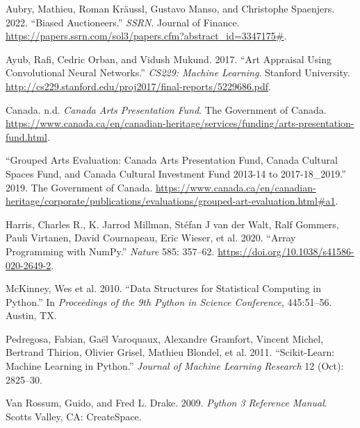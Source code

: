\documentclass[
]{article}
\newlength{\cslhangindent}
\newlength{\cslentryspacingunit} %
\newenvironment{CSLReferences}[2] %
 {%
  \setlength{\parindent}{0pt}
  \ifodd #1
  \let\oldpar\par
  \def\par{\hangindent=\cslhangindent\oldpar}
  \fi
  \setlength{\parskip}{#2\cslentryspacingunit}
 }%
 {}
\begin{document}
\hypertarget{refs}{}
\begin{CSLReferences}{1}{0}
\leavevmode{}%
Aubry, Mathieu, Roman Kräussl, Gustavo Manso, and Christophe Spaenjers.
2022. {``Biased Auctioneers.''} \emph{SSRN}. Journal of Finance.
\url{https://papers.ssrn.com/sol3/papers.cfm?abstract_id=3347175\#}.

\leavevmode{}%
Ayub, Rafi, Cedric Orban, and Vidush Mukund. 2017. {``Art Appraisal
Using Convolutional Neural Networks.''} \emph{CS229: Machine Learning}.
Stanford University.
\url{http://cs229.stanford.edu/proj2017/final-reports/5229686.pdf}.

\leavevmode{}%
Canada. n.d. \emph{Canada Arts Presentation Fund}. The Government of
Canada.
\url{https://www.canada.ca/en/canadian-heritage/services/funding/arts-presentation-fund.html}.

\leavevmode{}%
{``Grouped Arts Evaluation: Canada Arts Presentation Fund, Canada
Cultural Spaces Fund, and Canada Cultural Investment Fund 2013-14 to
2017-18\_2019.''} 2019. The Government of Canada.
\url{https://www.canada.ca/en/canadian-heritage/corporate/publications/evaluations/grouped-art-evaluation.html\#a1}.

\leavevmode{}%
Harris, Charles R., K. Jarrod Millman, Stéfan J van der Walt, Ralf
Gommers, Pauli Virtanen, David Cournapeau, Eric Wieser, et al. 2020.
{``Array Programming with {NumPy}.''} \emph{Nature} 585: 357--62.
\url{https://doi.org/10.1038/s41586-020-2649-2}.

\leavevmode{}%
McKinney, Wes et al. 2010. {``Data Structures for Statistical Computing
in Python.''} In \emph{Proceedings of the 9th Python in Science
Conference}, 445:51--56. Austin, TX.

\leavevmode{}%
Pedregosa, Fabian, Gaël Varoquaux, Alexandre Gramfort, Vincent Michel,
Bertrand Thirion, Olivier Grisel, Mathieu Blondel, et al. 2011.
{``Scikit-Learn: Machine Learning in Python.''} \emph{Journal of Machine
Learning Research} 12 (Oct): 2825--30.

\leavevmode{}%
Van Rossum, Guido, and Fred L. Drake. 2009. \emph{Python 3 Reference
Manual}. Scotts Valley, CA: CreateSpace.

\end{CSLReferences}
\end{document}
